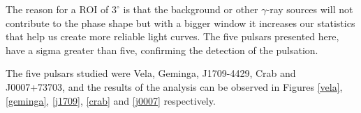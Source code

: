 \documentclass{PoS}
\begin{document}
 The reason for a ROI of $3^\circ$ is that the background or other $\gamma$-ray sources will not contribute  to the phase shape but with a bigger window it increases our statistics that help us create more reliable  light curves. The five pulsars presented here, have a sigma greater than five, confirming the detection of the pulsation.

The five pulsars studied were Vela, Geminga, J1709-4429, Crab and J0007+73703, and the results of the analysis can be observed in Figures \ref{vela}, \ref{geminga}, \ref{j1709}, \ref{crab} and \ref{j0007} respectively.
\end{document}
